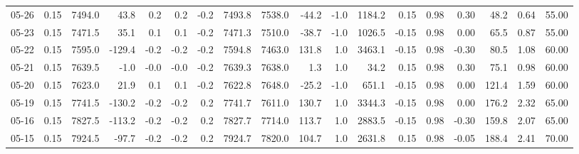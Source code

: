 \begin{threeparttable}
{\begin{tabular}{lrrrrrrrrrrrrrrrrr}
  05-26 &     0.15 & 7494.0 &              43.8 &               0.2 &                0.2 &               -0.2 & 7493.8 & 7538.0 &      -44.2 &                     -1.0 &              1184.2 &       0.15 &      0.98 &           0.30 &             48.2 &            0.64 &                  55.00 \\
  05-23 &     0.15 & 7471.5 &              35.1 &               0.1 &                0.1 &               -0.2 & 7471.3 & 7510.0 &      -38.7 &                     -1.0 &              1026.5 &      -0.15 &      0.98 &           0.00 &             65.5 &            0.87 &                  55.00 \\
  05-22 &     0.15 & 7595.0 &            -129.4 &              -0.2 &               -0.2 &               -0.2 & 7594.8 & 7463.0 &      131.8 &                      1.0 &              3463.1 &      -0.15 &      0.98 &          -0.30 &             80.5 &            1.08 &                  60.00 \\
  05-21 &     0.15 & 7639.5 &              -1.0 &              -0.0 &               -0.0 &               -0.2 & 7639.3 & 7638.0 &        1.3 &                      1.0 &                34.2 &       0.15 &      0.98 &           0.30 &             75.1 &            0.98 &                  60.00 \\
  05-20 &     0.15 & 7623.0 &              21.9 &               0.1 &                0.1 &               -0.2 & 7622.8 & 7648.0 &      -25.2 &                     -1.0 &               651.1 &      -0.15 &      0.98 &           0.00 &            121.4 &            1.59 &                  60.00 \\
  05-19 &     0.15 & 7741.5 &            -130.2 &              -0.2 &               -0.2 &                0.2 & 7741.7 & 7611.0 &      130.7 &                      1.0 &              3344.3 &      -0.15 &      0.98 &           0.00 &            176.2 &            2.32 &                  65.00 \\
  05-16 &     0.15 & 7827.5 &            -113.2 &              -0.2 &               -0.2 &                0.2 & 7827.7 & 7714.0 &      113.7 &                      1.0 &              2883.5 &      -0.15 &      0.98 &          -0.30 &            159.8 &            2.07 &                  65.00 \\
  05-15 &     0.15 & 7924.5 &             -97.7 &              -0.2 &               -0.2 &                0.2 & 7924.7 & 7820.0 &      104.7 &                      1.0 &              2631.8 &       0.15 &      0.98 &          -0.05 &            188.4 &            2.41 &                  70.00 \\

\end{tabular}}
\end{threeparttable}
